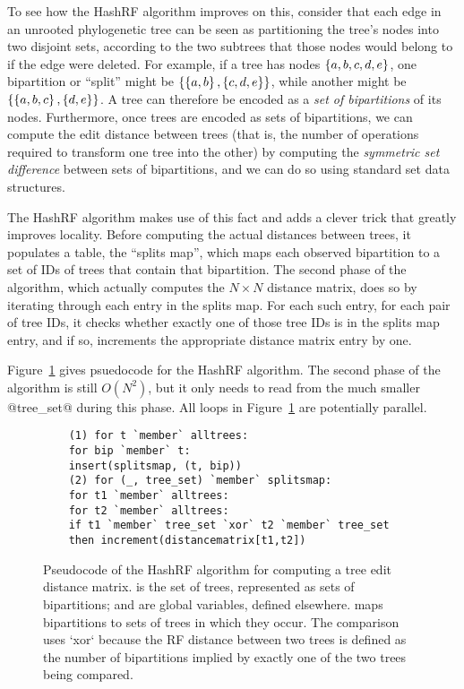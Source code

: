 To see how the HashRF algorithm improves on this, consider that each
edge in an unrooted phylogenetic tree can be seen as partitioning the
tree's nodes into two disjoint sets, according to the two subtrees
that those nodes would belong to if the edge were deleted.  For
example, if a tree has nodes $\left\{a, b, c, d, e\right\}$, one bipartition
or ``split'' might be $\left\{\left\{a, b\right\}, \left\{c, d, e\right\}\right\}$, while
another might be $\left\{\left\{a, b, c\right\}, \left\{d, e\right\}\right\}$.  A tree can
therefore be encoded as a \emph{set of bipartitions} of its nodes.
Furthermore, once trees are encoded as sets of bipartitions, we can
compute the edit distance between trees (that is, the number of
operations required to transform one tree into the other) by computing
the \emph{symmetric set difference} between sets of bipartitions, and
we can do so using standard set data structures.

The HashRF algorithm makes use of this fact and adds a clever trick
that greatly improves locality.  Before computing the actual distances
between trees, it populates a table, the ``splits map'', which maps
each observed bipartition to a set of IDs of trees that contain that
bipartition.  The second phase of the algorithm, which actually
computes the $N \times N$ distance matrix, does so by iterating
through each entry in the splits map.  For each such entry, for each
pair of tree IDs, it checks whether exactly one of those tree IDs is
in the splits map entry, and if so, increments the appropriate
distance matrix entry by one.

Figure~\ref{f:hashrf-alg} gives psuedocode for the HashRF algorithm.
The second phase of the algorithm is still $O(N^2)$, but it only needs
to read from the much smaller @tree_set@ during this phase.  All loops
in Figure~\ref{f:hashrf-alg} are potentially parallel.


\begin{figure}
  \singlespacing
  \begin{lstlisting}
    (1) for t `member` alltrees:
    for bip `member` t:
    insert(splitsmap, (t, bip))
    (2) for (_, tree_set) `member` splitsmap: 
    for t1 `member` alltrees:
    for t2 `member` alltrees:
    if t1 `member` tree_set `xor` t2 `member` tree_set
    then increment(distancematrix[t1,t2])
  \end{lstlisting}  
  \doublespacing
  \caption{Pseudocode of the HashRF algorithm for computing a tree
    edit distance matrix.   is the set of trees,
    represented as sets of bipartitions;  and
     are global variables, defined elsewhere.
     maps bipartitions to sets of trees in which they
    occur. The comparison uses `xor` because the RF distance between
    two trees is defined as the number of bipartitions implied by
    exactly one of the two trees being compared.}
  \label{f:hashrf-alg}
\end{figure}

